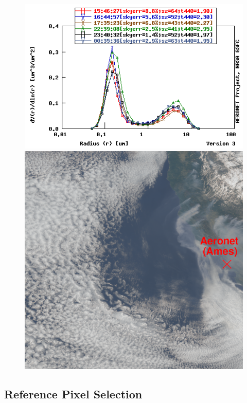 \documentclass[12pt]{article}
\begin{document}
\begin{figure}[h!]
    \centering
    \begin{center}
        \includegraphics[width=.55\paperwidth]{figs/20210818_aeronet_ames_sdist.png}
        \includegraphics[width=.55\paperwidth]{figs/20210818_aeronet_marked-rgb.png}
    \end{center}
    \caption{}
    \label{}
\end{figure}

\subsection{Reference Pixel Selection}
\end{document}
